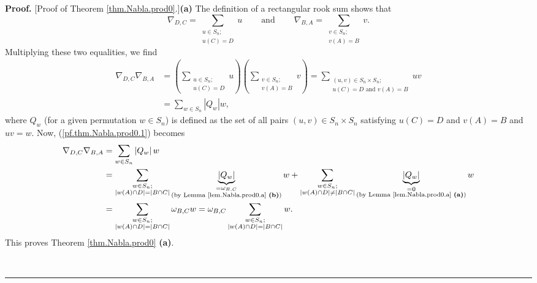 \documentclass[numbers=enddot,12pt,final,onecolumn,notitlepage]{scrartcl}%
\numberwithin{exer}{subsection}
\theoremstyle{definition}
\newenvironment{proof}[1][Proof]{\noindent\textbf{#1.} }{\ \rule{0.5em}{0.5em}}
\let\sumnonlimits\sum
\renewcommand{\sum}{\sumnonlimits\limits}
\begin{document}
\begin{proof}
[Proof of Theorem \ref{thm.Nabla.prod0}.]\textbf{(a)} The definition of a
rectangular rook sum shows that
\[
\nabla_{D,C}=\sum_{\substack{u\in S_{n};\\u\left(  C\right)  =D}%
}u\ \ \ \ \ \ \ \ \ \ \text{and}\ \ \ \ \ \ \ \ \ \ \nabla_{B,A}%
=\sum_{\substack{v\in S_{n};\\v\left(  A\right)  =B}}v.
\]
Multiplying these two equalities, we find%
\begin{align}
\nabla_{D,C}\nabla_{B,A}  &  =\left(  \sum_{\substack{u\in S_{n};\\u\left(
C\right)  =D}}u\right)  \left(  \sum_{\substack{v\in S_{n};\\v\left(
A\right)  =B}}v\right)  =\sum_{\substack{\left(  u,v\right)  \in S_{n}\times
S_{n};\\u\left(  C\right)  =D\text{ and }v\left(  A\right)  =B}}uv\nonumber\\
&  =\sum_{w\in S_{n}}\left\vert Q_{w}\right\vert w,
\label{pf.thm.Nabla.prod0.1}%
\end{align}
where $Q_{w}$ (for a given permutation $w\in S_{n}$) is defined as the set of
all pairs $\left(  u,v\right)  \in S_{n}\times S_{n}$ satisfying $u\left(
C\right)  =D$ and $v\left(  A\right)  =B$ and $uv=w$. Now,
(\ref{pf.thm.Nabla.prod0.1}) becomes%
\begin{align*}
\nabla_{D,C}\nabla_{B,A}  &  =\sum_{w\in S_{n}}\left\vert Q_{w}\right\vert w\\
&  =\sum_{\substack{w\in S_{n};\\\left\vert w\left(  A\right)  \cap
D\right\vert =\left\vert B\cap C\right\vert }}\underbrace{\left\vert
Q_{w}\right\vert }_{\substack{=\omega_{B,C}\\\text{(by Lemma
\ref{lem.Nabla.prod0.a} \textbf{(b)})}}}w+\sum_{\substack{w\in S_{n}%
;\\\left\vert w\left(  A\right)  \cap D\right\vert \neq\left\vert B\cap
C\right\vert }}\underbrace{\left\vert Q_{w}\right\vert }%
_{\substack{=0\\\text{(by Lemma \ref{lem.Nabla.prod0.a} \textbf{(a)})}}}w\\
&  =\sum_{\substack{w\in S_{n};\\\left\vert w\left(  A\right)  \cap
D\right\vert =\left\vert B\cap C\right\vert }}\omega_{B,C}w=\omega_{B,C}%
\sum_{\substack{w\in S_{n};\\\left\vert w\left(  A\right)  \cap D\right\vert
=\left\vert B\cap C\right\vert }}w.
\end{align*}
This proves Theorem \ref{thm.Nabla.prod0} \textbf{(a)}. \medskip


\end{proof}
\end{document}
